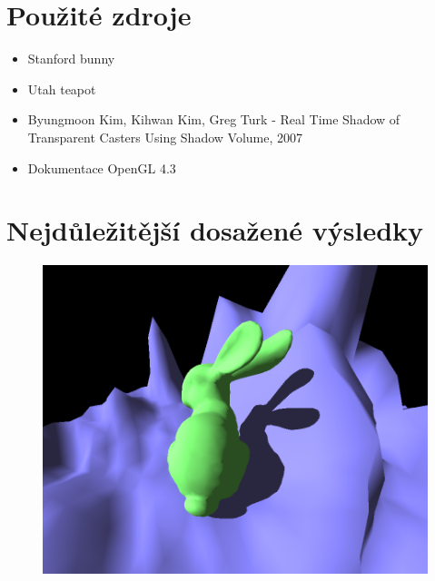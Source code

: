 \documentclass[11pt,a4paper]{article}
\begin{document}
\section{Použité zdroje}
\begin{itemize}
	\item Stanford bunny
	\item Utah teapot
	\item Byungmoon Kim, Kihwan Kim, Greg Turk - Real Time Shadow of Transparent Casters Using Shadow Volume, 2007
	\item Dokumentace OpenGL 4.3
\end{itemize}
\section{Nejdůležitější dosažené výsledky}

\begin{figure}[h]
	\captionsetup{type=figure}
	\includegraphics[width=\textwidth]{images/bunny.png}
\end{figure}
\end{document}
